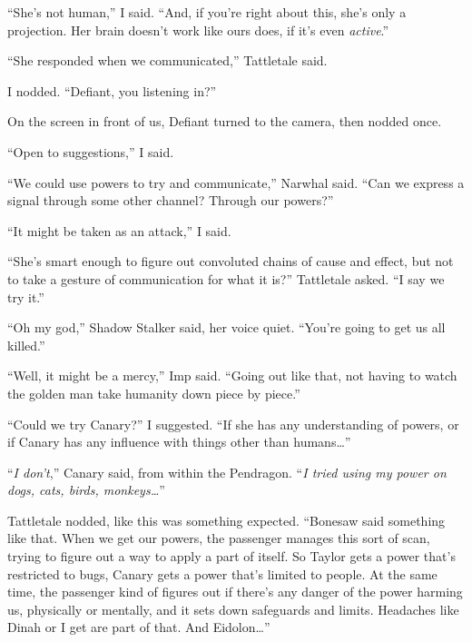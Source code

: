 ``She's not human,'' I said.  ``And, if you're right about this, she's only a projection.  Her brain doesn't work like ours does, if it's even \emph{active}.''



``She responded when we communicated,'' Tattletale said.



I nodded.  ``Defiant, you listening in?''



On the screen in front of us, Defiant turned to the camera, then nodded once.



``Open to suggestions,'' I said.



``We could use powers to try and communicate,'' Narwhal said.  ``Can we express a signal through some other channel?  Through our powers?''



``It might be taken as an attack,'' I said.



``She's smart enough to figure out convoluted chains of cause and effect, but not to take a gesture of communication for what it is?''  Tattletale asked.  ``I say we try it.''



``Oh my god,'' Shadow Stalker said, her voice quiet.  ``You're going to get us all killed.''



``Well, it might be a mercy,'' Imp said.  ``Going out like that, not having to watch the golden man take humanity down piece by piece.''



``Could we try Canary?'' I suggested.  ``If she has any understanding of powers, or if Canary has any influence with things other than humans\ldots''



``\emph{I don't},'' Canary said, from within the Pendragon.  ``\emph{I tried using my power on dogs, cats, birds, monkeys\ldots}''



Tattletale nodded, like this was something expected.  ``Bonesaw said something like that.  When we get our powers, the passenger manages this sort of scan, trying to figure out a way to apply a part of itself.  So Taylor gets a power that's restricted to bugs, Canary gets a power that's limited to people.  At the same time, the passenger kind of figures out if there's any danger of the power harming us, physically or mentally, and it sets down safeguards and limits.  Headaches like Dinah or I get are part of that.  And Eidolon\ldots''



